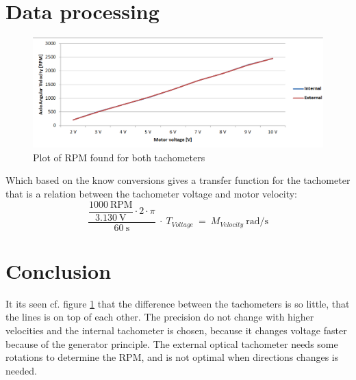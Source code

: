 \section*{Data processing}

\begin{figure}[htbp]
	\centering
	\includegraphics[width=\textwidth]{figures/appendix/Motor&GearTests/RPMTest}
	\caption{Plot of RPM found for both tachometers}\label{fig:RPMTest}
\end{figure}

Which based on the know conversions gives a transfer function for the tachometer that is a relation between the tachometer voltage and motor velocity:
\begin{equation}
\dfrac{\dfrac{1000\ \text{RPM}}{3.130\ \text{V}} \cdot 2 \cdot \pi}{60\ \text{s}}\ \cdot\ T_{Voltage}\ =\ M_{Velocity}\ \text{rad/s}
\end{equation}

\section*{Conclusion}
It its seen cf. figure \ref{fig:RPMTest} that the difference between the tachometers is so little, that the lines is on top of each other. The precision do not change with higher velocities and the internal tachometer is chosen, because it changes voltage faster because of the generator principle. The external optical tachometer needs some rotations to determine the RPM, and is not optimal when directions changes is needed.

